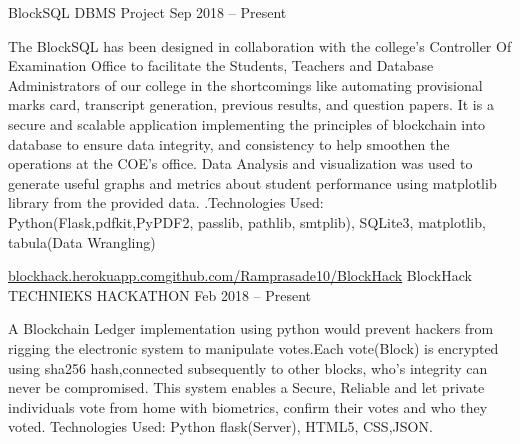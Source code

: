 

\begin{cventries}


  \cventry
    {\href{}{}\quad \quad \href{}{}} %
    {BlockSQL} %
    {DBMS Project} %
    {Sep 2018 – Present} %
    {
      \begin{cvitems} %
        \item {The BlockSQL has been designed in collaboration with the college's Controller Of Examination Office to facilitate the Students, Teachers and Database Administrators of our college in the shortcomings like automating provisional marks card, transcript generation, previous results, and question papers. It is a secure and scalable application implementing the principles of blockchain into database to ensure data integrity, and consistency to help smoothen the operations at the COE’s office.
Data Analysis and visualization was used to generate useful graphs and metrics about student performance using matplotlib library from the provided data.
.\newline{}Technologies Used: Python(Flask,pdfkit,PyPDF2, passlib, pathlib, smtplib), SQLite3, matplotlib, tabula(Data Wrangling)}
      \end{cvitems}
    }



  \cventry
    {\href{https://blockhack.herokuapp.com}{blockhack.herokuapp.com}\quad\textbar\quad \href{https://github.com/Ramprasade10/BlockHack}{github.com/Ramprasade10/BlockHack}} %
    {BlockHack} %
    {TECHNIEKS HACKATHON} %
    {Feb 2018 – Present} %
    {
      \begin{cvitems} %
        \item {A Blockchain Ledger implementation using python would prevent hackers from rigging the electronic system to manipulate votes.Each vote(Block) is encrypted using sha256 hash,connected subsequently to other blocks, who’s integrity can never be compromised. This system enables a Secure, Reliable and let private individuals vote from home with biometrics, confirm their votes and who they voted.\newline{}
Technologies Used: Python flask(Server), HTML5, CSS,JSON.}
      \end{cvitems}
    }


\end{cventries}
